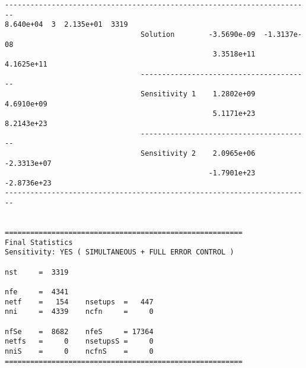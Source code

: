 \begin{verbatim}
------------------------------------------------------------------------
8.640e+04  3  2.135e+01  3319
                                Solution        -3.5690e-09  -1.3137e-08 
                                                 3.3518e+11   4.1625e+11 
                                ----------------------------------------
                                Sensitivity 1    1.2802e+09   4.6910e+09 
                                                 5.1171e+23   8.2143e+23 
                                ----------------------------------------
                                Sensitivity 2    2.0965e+06  -2.3313e+07 
                                                -1.7901e+23  -2.8736e+23 
------------------------------------------------------------------------


========================================================
Final Statistics
Sensitivity: YES ( SIMULTANEOUS + FULL ERROR CONTROL )

nst     =  3319

nfe     =  4341
netf    =   154    nsetups  =   447
nni     =  4339    ncfn     =     0

nfSe    =  8682    nfeS     = 17364
netfs   =     0    nsetupsS =     0
nniS    =     0    ncfnS    =     0
========================================================
\end{verbatim}